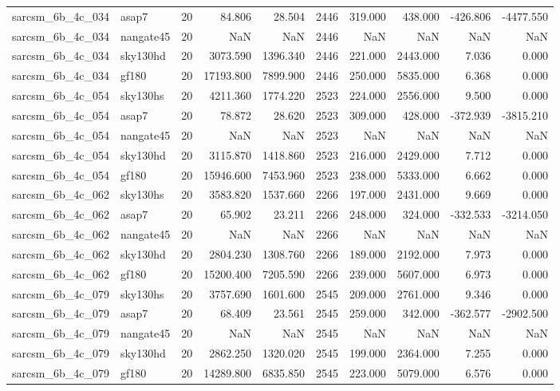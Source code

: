 \begin{longtable}{llrrrrrrrr}
sarcsm\_6b\_4c\_034 & asap7 & 20 & 84.806 & 28.504 & 2446 & 319.000 & 438.000 & -426.806 & -4477.550 \\
sarcsm\_6b\_4c\_034 & nangate45 & 20 & NaN & NaN & 2446 & NaN & NaN & NaN & NaN \\
sarcsm\_6b\_4c\_034 & sky130hd & 20 & 3073.590 & 1396.340 & 2446 & 221.000 & 2443.000 & 7.036 & 0.000 \\
sarcsm\_6b\_4c\_034 & gf180 & 20 & 17193.800 & 7899.900 & 2446 & 250.000 & 5835.000 & 6.368 & 0.000 \\
sarcsm\_6b\_4c\_054 & sky130hs & 20 & 4211.360 & 1774.220 & 2523 & 224.000 & 2556.000 & 9.500 & 0.000 \\
sarcsm\_6b\_4c\_054 & asap7 & 20 & 78.872 & 28.620 & 2523 & 309.000 & 428.000 & -372.939 & -3815.210 \\
sarcsm\_6b\_4c\_054 & nangate45 & 20 & NaN & NaN & 2523 & NaN & NaN & NaN & NaN \\
sarcsm\_6b\_4c\_054 & sky130hd & 20 & 3115.870 & 1418.860 & 2523 & 216.000 & 2429.000 & 7.712 & 0.000 \\
sarcsm\_6b\_4c\_054 & gf180 & 20 & 15946.600 & 7453.960 & 2523 & 238.000 & 5333.000 & 6.662 & 0.000 \\
sarcsm\_6b\_4c\_062 & sky130hs & 20 & 3583.820 & 1537.660 & 2266 & 197.000 & 2431.000 & 9.669 & 0.000 \\
sarcsm\_6b\_4c\_062 & asap7 & 20 & 65.902 & 23.211 & 2266 & 248.000 & 324.000 & -332.533 & -3214.050 \\
sarcsm\_6b\_4c\_062 & nangate45 & 20 & NaN & NaN & 2266 & NaN & NaN & NaN & NaN \\
sarcsm\_6b\_4c\_062 & sky130hd & 20 & 2804.230 & 1308.760 & 2266 & 189.000 & 2192.000 & 7.973 & 0.000 \\
sarcsm\_6b\_4c\_062 & gf180 & 20 & 15200.400 & 7205.590 & 2266 & 239.000 & 5607.000 & 6.973 & 0.000 \\
sarcsm\_6b\_4c\_079 & sky130hs & 20 & 3757.690 & 1601.600 & 2545 & 209.000 & 2761.000 & 9.346 & 0.000 \\
sarcsm\_6b\_4c\_079 & asap7 & 20 & 68.409 & 23.561 & 2545 & 259.000 & 342.000 & -362.577 & -2902.500 \\
sarcsm\_6b\_4c\_079 & nangate45 & 20 & NaN & NaN & 2545 & NaN & NaN & NaN & NaN \\
sarcsm\_6b\_4c\_079 & sky130hd & 20 & 2862.250 & 1320.020 & 2545 & 199.000 & 2364.000 & 7.255 & 0.000 \\
sarcsm\_6b\_4c\_079 & gf180 & 20 & 14289.800 & 6835.850 & 2545 & 223.000 & 5079.000 & 6.576 & 0.000 \\

\end{longtable}
